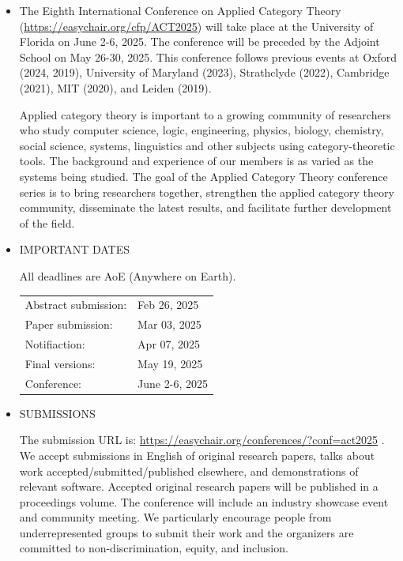\documentclass[prodmode,acmtecs]{acmsmall} %
\begin{document}
\begin{itemize}\item  The Eighth International Conference on Applied Category Theory (\href{https://easychair.org/cfp/ACT2025}{https://easychair.org/cfp/ACT2025}) will take place at the University of Florida on June 2-6, 2025. The conference will be preceded by the Adjoint School on May 26-30, 2025. This conference follows previous events at Oxford (2024, 2019), University of Maryland (2023), Strathclyde (2022), Cambridge (2021), MIT (2020), and Leiden (2019).  
 
  Applied category theory is important to a growing community of researchers who study computer science, logic, engineering, physics, biology, chemistry, social science, systems, linguistics and other subjects using category-theoretic tools. The background and experience of our members is as varied as the systems being studied. The goal of the Applied Category Theory conference series is to bring researchers together, strengthen the applied category theory community, disseminate the latest results, and facilitate further development of the field. 
 
\item IMPORTANT DATES  
 
  All deadlines are AoE (Anywhere on Earth). 
 
\begin{tabulary}{\linewidth}{LL}Abstract submission:  & Feb 26, 2025 \\
Paper submission:  & Mar 03, 2025 \\
Notifiaction:  & Apr 07, 2025 \\
Final versions:  & May 19, 2025 \\
Conference:  & June 2-6, 2025 \\
\end{tabulary}
 
\item  SUBMISSIONS 
 
  The submission URL is: \href{https://easychair.org/conferences/?conf=act2025}{https://easychair.org/conferences/?conf=act2025} . We accept submissions in English of original research papers, talks about work accepted/submitted/published elsewhere, and demonstrations of relevant software. Accepted original research papers will be published in a proceedings volume. The conference will include an industry showcase event and community meeting. We particularly encourage people from underrepresented groups to submit their work and the organizers are committed to non-discrimination, equity, and inclusion. 
 

\end{itemize}
\end{document}
